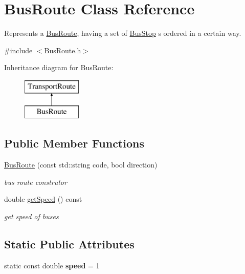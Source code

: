 \hypertarget{class_bus_route}{}\section{Bus\+Route Class Reference}
\label{class_bus_route}


Represents a \hyperlink{class_bus_route}{Bus\+Route}, having a set of \hyperlink{class_bus_stop}{Bus\+Stop} \textquotesingle{}s ordered in a certain way.  




{\ttfamily \#include $<$Bus\+Route.\+h$>$}

Inheritance diagram for Bus\+Route\+:\begin{figure}[H]
\begin{center}
\leavevmode
\includegraphics[height=2.000000cm]{class_bus_route}
\end{center}
\end{figure}
\subsection*{Public Member Functions}
\begin{DoxyCompactItemize}
\item 
\hyperlink{class_bus_route_a5b3f97c70fab168657fa24078bb4eecb}{Bus\+Route} (const std\+::string code, bool direction)
\begin{DoxyCompactList}\small\item\em bus route construtor \end{DoxyCompactList}\item 
double \hyperlink{class_bus_route_a6fd549a61adf27ce8a56259326fdc241}{get\+Speed} () const 
\begin{DoxyCompactList}\small\item\em get speed of buses \end{DoxyCompactList}\end{DoxyCompactItemize}
\subsection*{Static Public Attributes}
\begin{DoxyCompactItemize}
\item 
\hypertarget{class_bus_route_aca2d92a6ac67d67bf19654750ab26938}{}static const double {\bfseries speed} = 1\label{class_bus_route_aca2d92a6ac67d67bf19654750ab26938}

\end{DoxyCompactItemize}
